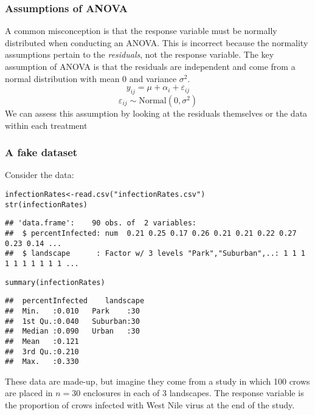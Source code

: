 \documentclass[color=usenames,dvipsnames]{beamer}\usepackage[]{graphicx}\usepackage[]{color}
\makeatletter
\newcommand{\hlstr}[1]{\textcolor[rgb]{0.749,0.012,0.012}{#1}}%
\newcommand{\hlstd}[1]{\textcolor[rgb]{0,0,0}{#1}}%
\newcommand{\hlkwb}[1]{\textcolor[rgb]{0,0.341,0.682}{#1}}%
\newcommand{\hlkwd}[1]{\textcolor[rgb]{0.004,0.004,0.506}{#1}}%
\newenvironment{kframe}{%
 \def\at@end@of@kframe{}%
 \ifinner\ifhmode%
  \def\at@end@of@kframe{\end{minipage}}%
  \begin{minipage}{\columnwidth}%
 \fi\fi%
 \def\FrameCommand##1{\hskip\@totalleftmargin \hskip-\fboxsep
 \colorbox{shadecolor}{##1}\hskip-\fboxsep
     \hskip-\linewidth \hskip-\@totalleftmargin \hskip\columnwidth}%
 \MakeFramed {\advance\hsize-\width
   \@totalleftmargin\z@ \linewidth\hsize
   \@setminipage}}%
 {\par\unskip\endMakeFramed%
 \at@end@of@kframe}
\newenvironment{knitrout}{}{} %
\makeatother
\begin{document}




\begin{frame}
  \frametitle{Assumptions of ANOVA}
  {%
    A common misconception is that the response variable must be
    normally distributed when conducting an ANOVA.}
  \pause
  \vfill
  {%
    This is incorrect because the normality assumptions pertain to
    the {\it residuals}, \alert{not} the response variable. The key assumption of
    ANOVA is that the residuals are independent and come from a normal
    distribution with mean 0 and variance $\sigma^2$.}
  \pause
  \large
\[
  y_{ij} = \mu + \alpha_i + \varepsilon_{ij}
\]
\[
  \varepsilon_{ij} \sim \text{Normal}(0, \sigma^2)
\]
\pause
\vfill
\normalsize
  {%
    We can assess this assumption by looking at the residuals
    themselves or the data within each treatment}
\end{frame}





\begin{frame}[fragile]
  \frametitle{A fake dataset}

\small
    Consider the data: %
\begin{knitrout}\tiny
{}\color{fgcolor}\begin{kframe}
\begin{alltt}
\hlstd{infectionRates} \hlkwb{<-} \hlkwd{read.csv}\hlstd{(}\hlstr{"infectionRates.csv"}\hlstd{)}
\hlkwd{str}\hlstd{(infectionRates)}
\end{alltt}
\begin{verbatim}
## 'data.frame':	90 obs. of  2 variables:
##  $ percentInfected: num  0.21 0.25 0.17 0.26 0.21 0.21 0.22 0.27 0.23 0.14 ...
##  $ landscape      : Factor w/ 3 levels "Park","Suburban",..: 1 1 1 1 1 1 1 1 1 1 ...
\end{verbatim}
\begin{alltt}
\hlkwd{summary}\hlstd{(infectionRates)}
\end{alltt}
\begin{verbatim}
##  percentInfected    landscape 
##  Min.   :0.010   Park    :30  
##  1st Qu.:0.040   Suburban:30  
##  Median :0.090   Urban   :30  
##  Mean   :0.121                
##  3rd Qu.:0.210                
##  Max.   :0.330
\end{verbatim}
\end{kframe}
\end{knitrout}
\vfill
These data are made-up, but imagine they come from a study in which
100 crows are placed in $n=30$ enclosures in each of 3 landscapes. The
response variable is the proportion of crows infected with West Nile
virus at the end of the study. \\
\end{frame}
\end{document}
